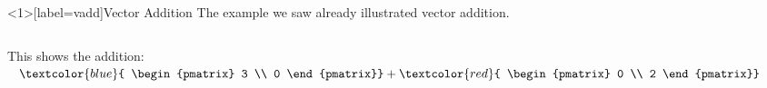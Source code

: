 \documentclass{beamer}
\begin{document}
\begin{frame}<1>[label=vadd]{Vector Addition}
    The example we saw already illustrated vector addition.
    \begin{columns}
    This shows the addition:
    \vfill
    \centering
    \begin{math}
        \textcolor{blue}{
        \begin{pmatrix}
            3 \\ 0
        \end{pmatrix}}
        +
        \textcolor{red}{
        \begin{pmatrix}
            0 \\ 2
        \end{pmatrix}}
    \end{math}

\end{columns}
\end{frame}
\end{document}
